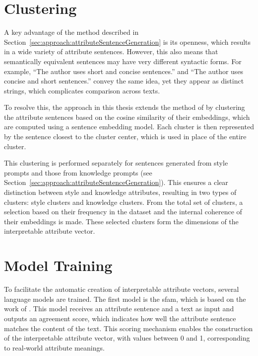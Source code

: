 \section{Clustering}%
\label{sec:approach:clustering}

A key advantage of the method described in Section~\ref{sec:approach:attributeSentenceGeneration} is its openness, which results in a wide variety of attribute sentences. However, this also means that semantically equivalent sentences may have very different syntactic forms. For example, \enquote{The author uses short and concise sentences.} and \enquote{The author uses concise and short sentences.} convey the same idea, yet they appear as distinct strings, which complicates comparison across texts.

To resolve this, the approach in this thesis extends the method of \citet{patelLearningInterpretableStyle2023} by clustering the attribute sentences based on the cosine similarity of their embeddings, which are computed using a sentence embedding model. Each cluster is then represented by the sentence closest to the cluster center, which is used in place of the entire cluster.

This clustering is performed separately for sentences generated from style prompts and those from knowledge prompts (see Section~\ref{sec:approach:attributeSentenceGeneration}). This ensures a clear distinction between style and knowledge attributes, resulting in two types of clusters: style clusters and knowledge clusters. From the total set of clusters, a selection based on their frequency in the dataset and the internal coherence of their embeddings is made. These selected clusters form the dimensions of the interpretable attribute vector.

\section{Model Training}%
\label{sec:approach:models}

To facilitate the automatic creation of interpretable attribute vectors, several language models are trained. The first model is the \acf{sfam}, which is based on the work of \citet{patelLearningInterpretableStyle2023}. This model receives an attribute sentence and a text as input and outputs an agreement score, which indicates how well the attribute sentence matches the content of the text. This scoring mechanism enables the construction of the interpretable attribute vector, with values between \num{0} and \num{1}, corresponding to real-world attribute meanings.

